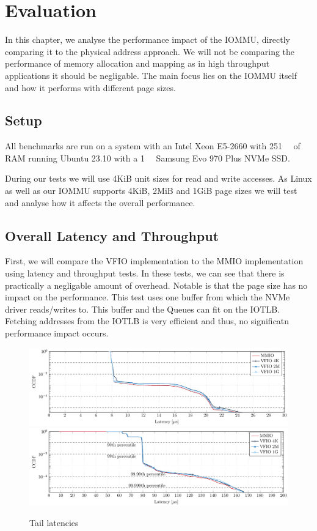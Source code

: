 \chapter{Evaluation}
In this chapter, we analyse the performance impact of the IOMMU, directly comparing it to the physical address approach. We will not be comparing the performance of memory allocation and mapping as in high throughput applications it should be negligable. The main focus lies on the IOMMU itself and how it performs with different page sizes.

\section{Setup}
All benchmarks are run on a system with an Intel Xeon E5-2660 with \qty{251}{\gibi\byte} of RAM running Ubuntu 23.10 with a \qty{1}{\tera\byte} Samsung Evo 970 Plus NVMe SSD.

During our tests we will use 4KiB unit sizes for read and write accesses.
As Linux as well as our IOMMU supports 4KiB, 2MiB and 1GiB page sizes we will test and analyse how it affects the overall performance.

\section{Overall Latency and Throughput}
First, we will compare the VFIO implementation to the MMIO implementation using latency and throughput tests. In these tests, we can see that there is practically a negligable amount of overhead. Notable is that the page size has no impact on the performance. This test uses one buffer from which the NVMe driver reads/writes to. This buffer and the Queues can fit on the IOTLB. Fetching addresses from the IOTLB is very efficient and thus, no significatn performance impact occurs.
\begin{figure}
    \centering
     {\includegraphics[width=\textwidth]{figures/latency_ccdf_write} \label{fig:ccdf-write}}
     {\includegraphics[width=\textwidth]{figures/latency_ccdf_read} \label{fig:ccdf-read}}
    \caption{Tail latencies}
    \label{fig:ccdf}
\end{figure}

